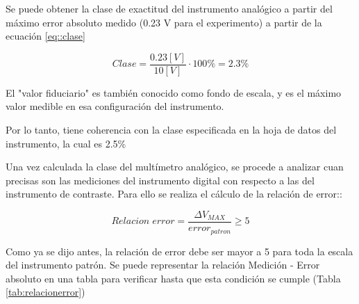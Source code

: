\begin{table}[H]
    \centering
        \def\tablename{Tabla} 
        \caption{Mediciones del instrumento patrón y el máximo error absoluto}
        \label{tab:exp1b}
\end{table}


Se puede obtener la clase de exactitud del instrumento analógico a partir del máximo error absoluto medido (0.23 V para el experimento) a partir de la ecuación \ref{eq::clase}

\begin{equation}
    Clase= \frac{0.23 [V]}{10 [V]} \cdot 100\% = 2.3\%
\end{equation}

El "valor fiduciario" es también conocido como fondo de escala, y es el máximo valor medible en esa configuración del instrumento.

Por lo tanto, tiene coherencia con la clase especificada en la hoja de datos del instrumento, la cual es 2.5\%

Una vez calculada la clase del multímetro analógico, se procede a analizar cuan precisas son las mediciones del instrumento digital con respecto a las del instrumento de contraste. Para ello se realiza el cálculo de la relación de error::

\begin{equation}
    Relacion\;error = \frac{\Delta V_{MAX}}{error_{patron}} \ge 5
\end{equation}

Como ya se dijo antes, la relación de error debe ser mayor a 5 para toda la escala del instrumento patrón. Se puede representar la relación Medición - Error absoluto en una tabla para verificar hasta que esta condición se cumple (Tabla \ref{tab:relacionerror})

